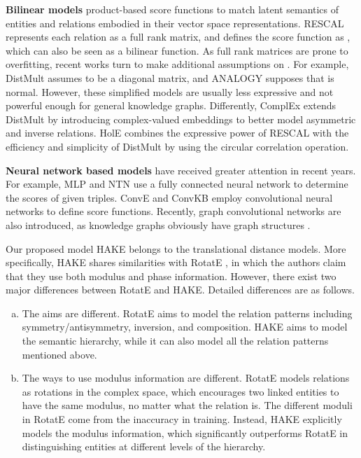 \documentclass[letterpaper]{article} \usepackage{aaai20}  \usepackage{times}  \usepackage{helvet} \usepackage{courier}  \usepackage[hyphens]{url}  \usepackage{graphicx} \urlstyle{rm} \def\UrlFont{\rm}  \usepackage{graphicx}  \frenchspacing  \setlength{\pdfpagewidth}{8.5in}  \setlength{\pdfpageheight}{11in}
\newcommand{\citep}{\cite}
\begin{document}
\textbf{Bilinear models} product-based score functions to match latent semantics of entities and relations embodied in their vector space representations. RESCAL \citep{rescal} represents each relation as a full rank matrix, and defines the score function as , which can also be seen as a bilinear function. As full rank matrices are prone to overfitting, recent works turn to make additional assumptions on . For example, DistMult \citep{distmult} assumes  to be a diagonal matrix, and ANALOGY \citep{analogy} supposes that  is normal. However, these simplified models are usually less expressive and not powerful enough for general knowledge graphs. Differently, ComplEx \citep{complex} extends DistMult by introducing complex-valued embeddings to better model asymmetric and inverse relations. HolE \citep{hole} combines the expressive power of RESCAL with the efficiency and simplicity of DistMult by using the circular correlation operation.

\textbf{Neural network based models} have received greater attention in recent years. For example, MLP \citep{mlp} and NTN \citep{ntn} use a fully connected neural network to determine the scores of given triples.  ConvE \citep{conve} and ConvKB \citep{convkb} employ convolutional neural networks to define score functions. Recently, graph convolutional networks are also introduced, as knowledge graphs obviously have graph structures \citep{rgcn}. 

Our proposed model HAKE belongs to the translational distance models. More specifically, HAKE shares similarities with RotatE \citep{rotate}, in which the authors claim that they use both modulus and phase information. However, there exist two major differences between RotatE and HAKE. Detailed differences are as follows.
\begin{enumerate}[(a)]
    \item The aims are different. RotatE aims to model the relation patterns including symmetry/antisymmetry, inversion, and composition. HAKE aims to model the semantic hierarchy, while it can also model all the relation patterns mentioned above.
    \item The ways to use modulus information are different. RotatE models relations as rotations in the complex space, which encourages two linked entities to have the same modulus, no matter what the relation is. The different moduli in RotatE come from the inaccuracy in training. Instead, HAKE explicitly models the modulus information, which significantly outperforms RotatE in distinguishing entities at different levels of the hierarchy.
\end{enumerate} 
\end{document}
